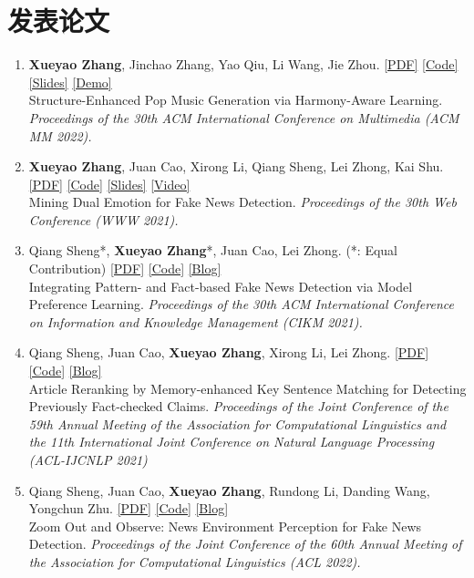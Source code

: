 \documentclass{resume}
\begin{document}
\section{发表论文}

\begin{enumerate}\itemsep 0.5em
  \item \textbf{Xueyao Zhang}, Jinchao Zhang, Yao Qiu, Li Wang, Jie Zhou. \href{https://dl.acm.org/doi/10.1145/3503161.3548084}{[PDF]} \href{https://github.com/RMSnow/HAT}{[Code]} \href{https://www.zhangxueyao.com/data/HAT/slides.pdf}{[Slides]} \href{https://www.zhangxueyao.com/data/HAT/demo.html}{[Demo]}\\Structure-Enhanced Pop Music Generation via Harmony-Aware Learning. \textit{Proceedings of the 30th ACM International Conference on Multimedia (ACM MM 2022).}
  \item \textbf{Xueyao Zhang}, Juan Cao, Xirong Li, Qiang Sheng, Lei Zhong, Kai Shu. \href{https://dl.acm.org/doi/pdf/10.1145/3442381.3450004}{[PDF]} \href{https://github.com/RMSnow/WWW2021}{[Code]} \href{https://www.zhangxueyao.com/assets/www2021-dual-emotion-slides.pdf}{[Slides]} \href{https://www.bilibili.com/video/BV13o4y1m7c3}{[Video]}\\ Mining Dual Emotion for Fake News Detection. \textit{Proceedings of the 30th Web Conference (WWW 2021).}
  \item Qiang Sheng*, \textbf{Xueyao Zhang}*, Juan Cao, Lei Zhong.  (*: Equal Contribution) \href{https://dl.acm.org/doi/10.1145/3459637.3482440}{[PDF]} \href{https://github.com/ICTMCG/Pref-FEND}{[Code]} \href{https://zhuanlan.zhihu.com/p/414464291}{[Blog]}\\Integrating Pattern- and Fact-based Fake News Detection via Model Preference Learning. \textit{Proceedings of the 30th ACM International Conference on Information and Knowledge Management (CIKM 2021).}
  \item Qiang Sheng, Juan Cao, \textbf{Xueyao Zhang}, Xirong Li, Lei Zhong. \href{https://aclanthology.org/2021.acl-long.425.pdf}{[PDF]} \href{https://github.com/ICTMCG/MTM}{[Code]} \href{https://zhuanlan.zhihu.com/p/393615707}{[Blog]}\\Article Reranking by Memory-enhanced Key Sentence Matching for Detecting Previously Fact-checked Claims. \textit{Proceedings of the Joint Conference of the 59th Annual Meeting of the Association for Computational Linguistics and the 11th International Joint Conference on Natural Language Processing (ACL-IJCNLP 2021) }
  \item Qiang Sheng, Juan Cao, \textbf{Xueyao Zhang}, Rundong Li, Danding Wang, Yongchun Zhu. \href{https://aclanthology.org/2022.acl-long.311.pdf}{[PDF]} \href{https://github.com/ICTMCG/News-Environment-Perception}{[Code]} \href{https://mp.weixin.qq.com/s/aTFeuCYIpSoazeRi52jqew}{[Blog]}\\Zoom Out and Observe: News Environment Perception for Fake News Detection. \textit{Proceedings of the Joint Conference of the 60th Annual Meeting of the Association for Computational Linguistics (ACL 2022).}
\end{enumerate}
\end{document}
